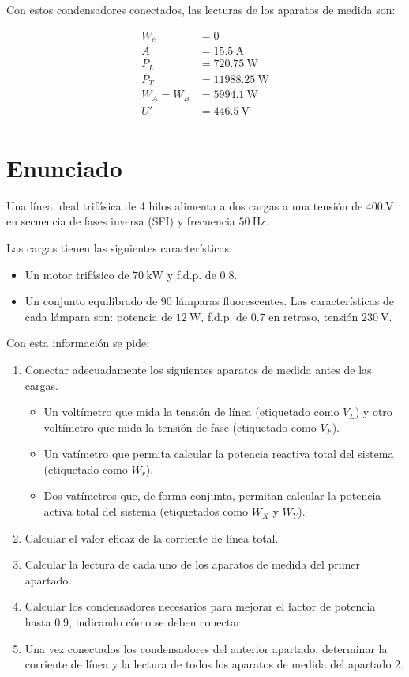 Con estos condensadores conectados, las lecturas de los aparatos de
medida son:

\begin{align*}
  W_c &= 0\\
  A &= \SI{15.5}{\ampere}\\
  P_L &= \SI{720.75}{\watt}\\
  P_T &= \SI{11988.25}{\watt}\\
  W_A = W_B &= \SI{5994.1}{\watt}\\
  U' &= \SI{446.5}{\volt}\\  
\end{align*}



\section{Enunciado}

Una línea ideal trifásica de 4 hilos alimenta a dos cargas a una
tensión de $\SI{400}{\volt}$ en secuencia de fases inversa (SFI) y
frecuencia $\SI{50}{\hertz}$.

Las cargas tienen las siguientes características:

\begin{itemize}
\item Un motor trifásico de $\SI{70}{\kilo\watt}$ y f.d.p. de 0.8.
\item Un conjunto equilibrado de 90 lámparas fluorescentes. Las
  características de cada lámpara son: potencia de $\SI{12}{\watt}$,
  f.d.p. de 0.7 en retraso, tensión $\SI{230}{\volt}$.
\end{itemize}

Con esta información se pide:

\begin{enumerate}
\item Conectar adecuadamente los siguientes aparatos de medida antes
  de las cargas.
  \begin{itemize}
  \item Un voltímetro que mida la tensión de línea (etiquetado como
    $V_L$) y otro voltímetro que mida la tensión de fase (etiquetado
    como $V_F$).
  \item Un vatímetro que permita calcular la potencia reactiva total
    del sistema (etiquetado como $W_r$).
  \item Dos vatímetros que, de forma conjunta, permitan calcular la
    potencia activa total del sistema (etiquetados como $W_X$ y
    $W_Y$).
  \end{itemize}
\item Calcular el valor eficaz de la corriente de línea
  total.
\item Calcular la lectura de cada uno de los aparatos
  de medida del primer apartado.
\item Calcular los condensadores necesarios para
  mejorar el factor de potencia hasta 0,9, indicando cómo se deben
  conectar.
\item Una vez conectados los condensadores del anterior
  apartado, determinar la corriente de línea y la lectura de todos los
  aparatos de medida del apartado 2.
\end{enumerate}

